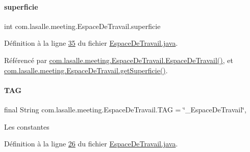 \paragraph{\texorpdfstring{superficie}{superficie}}
{\footnotesize\ttfamily int com.\+lasalle.\+meeting.\+Espace\+De\+Travail.\+superficie\hspace{0.3cm}{\ttfamily [private]}}



Définition à la ligne \hyperlink{_espace_de_travail_8java_source_l00035}{35} du fichier \hyperlink{_espace_de_travail_8java_source}{Espace\+De\+Travail.\+java}.



Référencé par \hyperlink{_espace_de_travail_8java_source_l00070}{com.\+lasalle.\+meeting.\+Espace\+De\+Travail.\+Espace\+De\+Travail()}, et \hyperlink{_espace_de_travail_8java_source_l00102}{com.\+lasalle.\+meeting.\+Espace\+De\+Travail.\+get\+Superficie()}.

\mbox{\label{classcom_1_1lasalle_1_1meeting_1_1_espace_de_travail_a30a7c9d0d084360b166487dbcdf5bad1}} 
\paragraph{\texorpdfstring{T\+AG}{TAG}}
{\footnotesize\ttfamily final String com.\+lasalle.\+meeting.\+Espace\+De\+Travail.\+T\+AG = \char`\"{}\+\_\+\+Espace\+De\+Travail\char`\"{}\hspace{0.3cm}{\ttfamily [static]}, {\ttfamily [private]}}

Les constantes 

Définition à la ligne \hyperlink{_espace_de_travail_8java_source_l00026}{26} du fichier \hyperlink{_espace_de_travail_8java_source}{Espace\+De\+Travail.\+java}.

\mbox{\label{classcom_1_1lasalle_1_1meeting_1_1_espace_de_travail_ad5349fa46af27855755ce6cee644a6e2}} 
